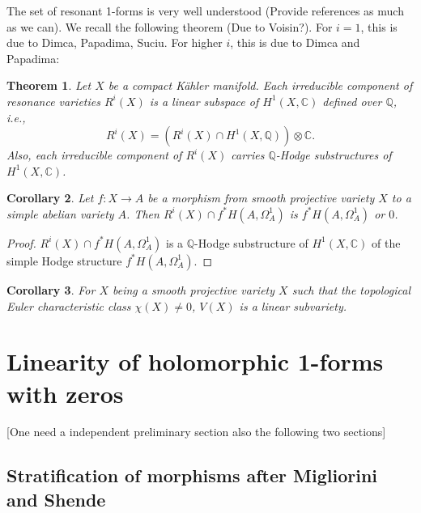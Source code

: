 \documentclass[a4paper,12pt,reqno]{amsart}
\newtheorem{theorem}{Theorem}[section]
\theoremstyle{plain}
\newtheorem{corollary}[theorem]{Corollary}
\theoremstyle{definition}
\theoremstyle{remark}
\newcommand{\Q}{\mathbb Q}
\newcommand{\C}{\mathbb C}
\begin{document}
The set of resonant 1-forms is very well understood {\color{red} (Provide references as much as we can)}. We recall the following theorem {\color{red} (Due to Voisin?)}. For $i=1$, this is due to Dimca, Papadima, Suciu. For higher $i$, this is due to Dimca and Papadima:

\begin{theorem}{\cite[Theorem C, Corollary 1.7]{DiPa13}}\label{thm: resonant}
Let $X$ be a compact K\"ahler manifold. Each irreducible component of resonance varieties $R^i(X)$ is a linear subspace of $H^1(X, \C)$ defined over $\Q$, i.e., $$R^i(X)=(R^i(X)\cap H^1(X, \Q))\otimes\C.$$ Also,  each irreducible component of $R^i(X)$ carries $\Q$-Hodge substructures of $H^1(X, \C)$.
\end{theorem} 

\begin{corollary}
Let $f:X\to A$ be a morphism from smooth projective variety $X$ to a simple abelian  variety $A$. Then $R^i(X)\cap f^*H(A, \Omega_A^1)$ is $f^*H(A, \Omega_A^1)$ or $0$.
\end{corollary}

\begin{proof}
$R^i(X)\cap f^*H(A, \Omega_A^1)$ is a $\Q$-Hodge substructure of $H^1(X, \C)$ of the simple Hodge structure $f^*H(A, \Omega_A^1)$.
\end{proof}

\begin{corollary}\label{ECNT}
For $X$ being a smooth projective variety $X$ such that the topological Euler characteristic class $\chi(X)\not=0$, $V(X)$ is a linear subvariety.
\end{corollary}


\section{Linearity of holomorphic 1-forms with zeros} [{\color{red}One need a independent preliminary section also the following two sections}]
%





\subsection{Stratification of morphisms after Migliorini and Shende}
\end{document}
